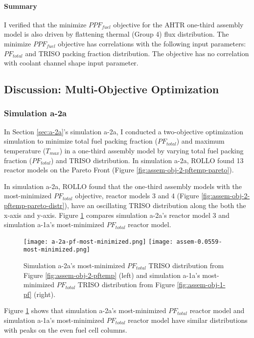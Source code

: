 \paragraph{Summary}
I verified that the minimize $PPF_{fuel}$ objective for the \gls{AHTR} one-third assembly 
model is also driven by flattening thermal (Group 4) flux distribution. 
The minimize $PPF_{fuel}$ objective has correlations with the following input parameters: 
$PF_{total}$ and TRISO packing fraction distribution. 
The objective has no correlation with coolant channel shape input parameter.

\subsection{Discussion: Multi-Objective Optimization}
\label{sec:assem-discussion-multi}

\subsubsection{Simulation a-2a}
In Section \ref{sec:a-2a}'s simulation a-2a, I conducted a two-objective 
optimization simulation to minimize total fuel packing fraction ($PF_{total}$) and 
maximum temperature ($T_{max}$) in a one-third assembly model by varying total fuel 
packing fraction ($PF_{total}$) and TRISO distribution. 
In simulation a-2a, ROLLO found 13 reactor models on the Pareto Front (Figure 
\ref{fig:assem-obj-2-pftemp-pareto}). 

In simulation a-2a, \gls{ROLLO} found that the one-third assembly models with the 
most-minimized $PF_{total}$ objective, reactor models 3 and 4 (Figure 
\ref{fig:assem-obj-2-pftemp-pareto-distr}), have an oscillating TRISO distribution 
along the both the x-axis and y-axis. 
Figure \ref{fig:a-2a-pf-triso-comparison} compares simulation a-2a's reactor model 3 and 
simulation a-1a's most-minimized $PF_{total}$ reactor model. 
\begin{figure}[htbp!]
    \centering
    \texttt{[image: a-2a-pf-most-minimized.png]} 
    \texttt{[image: assem-0.0559-most-minimized.png]} 
    \caption{Simulation a-2a's most-minimized $PF_{total}$ TRISO distribution 
    from Figure \ref{fig:assem-obj-2-pftemp} (left) and simulation a-1a's 
    most-minimized $PF_{total}$ TRISO distribution from Figure 
    \ref{fig:assem-obj-1-pf} (right).}
    \label{fig:a-2a-pf-triso-comparison}
\end{figure}
Figure \ref{fig:a-2a-pf-triso-comparison} shows that simulation a-2a's most-minimized 
$PF_{total}$ reactor model and simulation a-1a's most-minimized $PF_{total}$ reactor 
model have similar distributions with peaks on the even fuel cell columns. 

